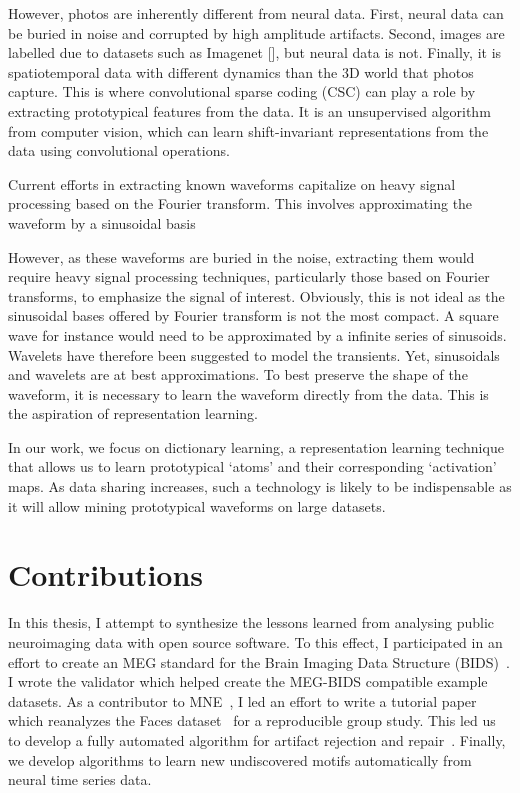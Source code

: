 However, photos are inherently different from neural data. First, neural data can be buried in noise and corrupted by high amplitude artifacts. Second, images are labelled due to datasets such as Imagenet [], but neural data is not. Finally, it is spatiotemporal data with different dynamics than the 3D world that photos capture. This is where convolutional sparse coding (CSC) can play a role by extracting prototypical features from the data. It is an unsupervised algorithm from computer vision, which can learn shift-invariant representations from the data using convolutional operations.

Current efforts in extracting known waveforms capitalize on heavy signal processing based on the Fourier transform. This involves approximating the waveform by a sinusoidal basis

However, as these waveforms are buried in the noise, extracting them would require heavy signal processing techniques, particularly those based on Fourier transforms, to emphasize the signal of interest. Obviously, this is not ideal as the sinusoidal bases offered by Fourier transform is not the most compact. A square wave for instance would need to be approximated by a infinite series of sinusoids. Wavelets have therefore been suggested to model the transients. Yet, sinusoidals and wavelets are at best approximations. To best preserve the shape of the waveform, it is necessary to learn the waveform directly from the data. This is the aspiration of representation learning.

In our work, we focus on dictionary learning, a representation learning technique that allows us to learn prototypical `atoms' and their corresponding `activation' maps. As data sharing increases, such a technology is likely to be indispensable as it will allow mining prototypical waveforms on large datasets.

\clearpage
\section{Contributions}
In this thesis, I attempt to synthesize the lessons learned from analysing public neuroimaging data with open source software. To this effect, I participated in an effort to create an MEG standard for the Brain Imaging Data Structure (BIDS)~\citep{galan2017meg}. I wrote the validator which helped create the MEG-BIDS compatible example datasets. As a contributor to MNE~\citep{gramfort2013meg}, I led an effort to write a tutorial paper which reanalyzes the Faces dataset~\citep{wakeman2015multi} for a reproducible group study. This led us to develop a fully automated algorithm for artifact rejection and repair~\citep{jas2016automated, jas2017autoreject}. Finally, we develop algorithms to learn new undiscovered motifs automatically from neural time series data. 

